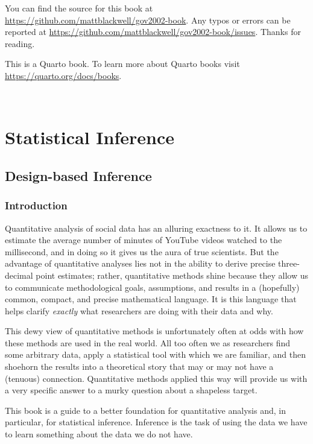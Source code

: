 \documentclass[
  13pt,
  letterpaper,
  DIV=11,
  numbers=noendperiod]{scrreprt}
\theoremstyle{plain}
\theoremstyle{plain}
\theoremstyle{definition}
\theoremstyle{definition}
\theoremstyle{remark}
\begin{document}

You can find the source for this book at
\url{https://github.com/mattblackwell/gov2002-book}. Any typos or errors
can be reported at
\url{https://github.com/mattblackwell/gov2002-book/issues}. Thanks for
reading.

This is a Quarto book. To learn more about Quarto books visit
\url{https://quarto.org/docs/books}.

\(\,\) \(\,\)

\part{Statistical Inference}

\chapter{Design-based Inference}\label{sec-design-based}

\section{Introduction}\label{introduction}

Quantitative analysis of social data has an alluring exactness to it. It
allows us to estimate the average number of minutes of YouTube videos
watched to the millisecond, and in doing so it gives us the aura of true
scientists. But the advantage of quantitative analyses lies not in the
ability to derive precise three-decimal point estimates; rather,
quantitative methods shine because they allow us to communicate
methodological goals, assumptions, and results in a (hopefully) common,
compact, and precise mathematical language. It is this language that
helps clarify \emph{exactly} what researchers are doing with their data
and why.

This dewy view of quantitative methods is unfortunately often at odds
with how these methods are used in the real world. All too often we as
researchers find some arbitrary data, apply a statistical tool with
which we are familiar, and then shoehorn the results into a theoretical
story that may or may not have a (tenuous) connection. Quantitative
methods applied this way will provide us with a very specific answer to
a murky question about a shapeless target.

This book is a guide to a better foundation for quantitative analysis
and, in particular, for statistical inference. Inference is the task of
using the data we have to learn something about the data we do not have.
\end{document}
